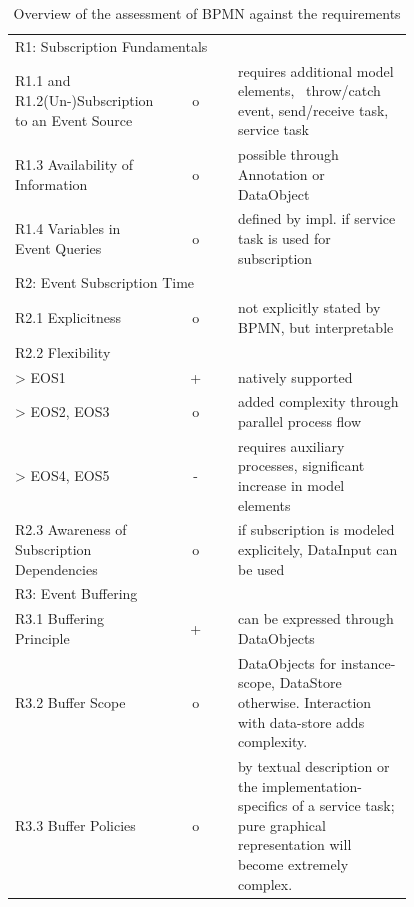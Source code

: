 \begin{table}%
	\myfloatalign
	\begin{tabularx}{\textwidth}{p{0.35\linewidth} | c | p{0.44\linewidth}}
		\toprule
		\tableheadline{Requirement} & \tableheadline{Ev.} & \tableheadline{Explanation} \\ 
		\midrule
		
		\multicolumn{3}{p{\linewidth}}{\rule{0pt}{4ex} R1: Subscription Fundamentals} \\
		\midrule
		
		R1.1 and R1.2\newline(Un-)Subscription to an Event Source & o & requires additional model elements, \eg~throw/catch event, send/receive task, service task \\
		R1.3 Availability of Information & o & possible through Annotation or DataObject \\
		R1.4 Variables in Event Queries & o & defined by impl. if service task is used for subscription \\
		
		\midrule
		\multicolumn{3}{p{\linewidth}}{\rule{0pt}{4ex} R2: Event Subscription Time} \\
		\midrule
		
		R2.1 Explicitness & o & not explicitly stated by BPMN, but interpretable \\
		R2.2 Flexibility & & \\
		> EOS1 & + & natively supported \\
		> EOS2, EOS3 & o & added complexity through parallel process flow \\
		> EOS4, EOS5 & - & requires auxiliary processes, significant increase in model elements \\
		R2.3 Awareness of Subscription Dependencies & o & if subscription is modeled explicitely, DataInput can be used \\
		
		\midrule
		\multicolumn{3}{p{\linewidth}}{\rule{0pt}{4ex} R3: Event Buffering} \\
		\midrule
		
		R3.1 Buffering Principle & + & can be expressed through DataObjects \\
		R3.2 Buffer Scope & o & DataObjects for instance-scope, DataStore otherwise. Interaction with data-store adds complexity. \\
		R3.3 Buffer Policies & o & by textual description or the implementation-specifics of a service task; pure graphical representation will become extremely complex. \\
		
	\end{tabularx}
	\caption[]{Overview of the assessment of BPMN against the requirements}
	\label{tab:assessment-bpmn}
\end{table}





